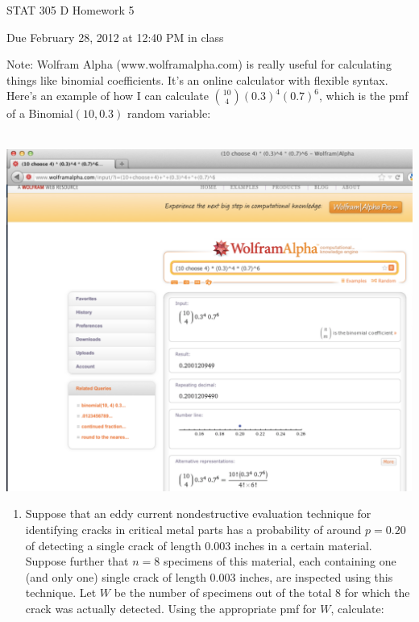 \documentclass{article}\usepackage{graphicx, color}
\numberwithin{equation}{section}
\begin{document}
\begin{flushleft}

\begin{center} \LARGE
STAT 305 D Homework 5 
\end{center}
\begin{center} \Large
Due February 28, 2012 at 12:40 PM in class
\end{center}
\normalsize

Note: Wolfram Alpha (www.wolframalpha.com) is really useful for calculating things like binomial coefficients. It's an online calculator with flexible syntax. Here's an example of how I can calculate $\binom{10}{4} (0.3)^4 (0.7)^6$, which is the pmf of a Binomial$(10,0.3)$ random variable:

$\quad$ \newline \includegraphics[scale=0.35,angle=0]{../../fig/wolf} \newline


\begin{enumerate}[1. ]
\item 
Suppose that an eddy current nondestructive evaluation technique for identifying cracks in critical metal parts has a probability of around $p=0.20$ of detecting a single crack of length 0.003 inches in a certain material. Suppose further that $n=8$ specimens of this material, each containing one (and only one) single crack of length 0.003 inches, are inspected using this technique. Let $W$ be the number of specimens out of the total 8 for which the crack was actually detected. Using the appropriate pmf for $W$, calculate:


\end{enumerate}
\end{flushleft}
\end{document}
